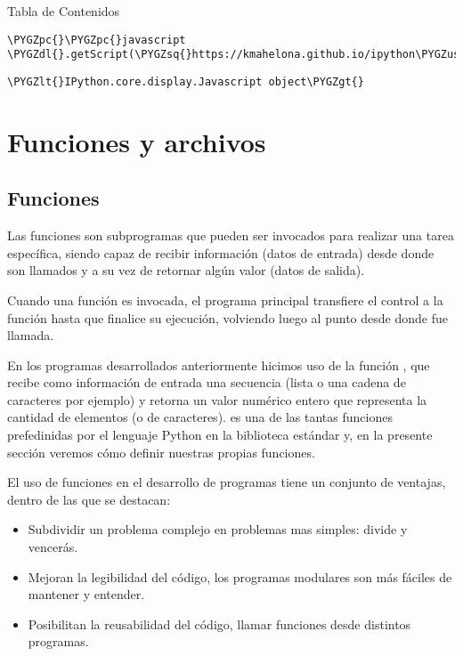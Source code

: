 \documentclass[a4paper,12pt,spanish]{sphinxmanual}
\def\PYGZus{\char`\_}
\def\PYGZlt{\char`\<}
\def\PYGZgt{\char`\>}
\def\PYGZpc{\char`\%}
\def\PYGZdl{\char`\$}
\def\PYGZsq{\char`\'}
\renewcommand\PYGZsq{\textquotesingle}
\begin{document}
Tabla de Contenidos

\begin{Verbatim}[commandchars=\\\{\}]
\PYGZpc{}\PYGZpc{}javascript
\PYGZdl{}.getScript(\PYGZsq{}https://kmahelona.github.io/ipython\PYGZus{}notebook\PYGZus{}goodies/ipython\PYGZus{}notebook\PYGZus{}toc.js\PYGZsq{})
\end{Verbatim}

\begin{Verbatim}[commandchars=\\\{\}]
\PYGZlt{}IPython.core.display.Javascript object\PYGZgt{}
\end{Verbatim}


\chapter{Funciones y archivos}
\label{Unidad04:funciones-y-archivos}\label{Unidad04::doc}

\section{Funciones}
\label{Unidad04:funciones}
Las funciones son subprogramas que pueden ser invocados para realizar
una tarea específica, siendo capaz de recibir información (datos de
entrada) desde donde son llamados y a su vez de retornar algún valor
(datos de salida).

Cuando una función es invocada, el programa principal transfiere el
control a la función hasta que finalice su ejecución, volviendo luego al
punto desde donde fue llamada.

En los programas desarrollados anteriormente hicimos uso de la función
, que recibe como información de entrada una secuencia (lista o
una cadena de caracteres por ejemplo) y retorna un valor numérico entero
que representa la cantidad de elementos (o de caracteres).  es
una de las tantas funciones prefedinidas por el lenguaje Python en la
biblioteca estándar y, en la presente sección veremos cómo definir
nuestras propias funciones.

El uso de funciones en el desarrollo de programas tiene un conjunto de
ventajas, dentro de las que se destacan:
\begin{itemize}
\item {} 
Subdividir un problema complejo en problemas mas simples: divide y
vencerás.

\item {} 
Mejoran la legibilidad del código, los programas modulares son más
fáciles de mantener y entender.

\item {} 
Posibilitan la reusabilidad del código, llamar funciones desde
distintos programas.

\end{itemize}
\end{document}
